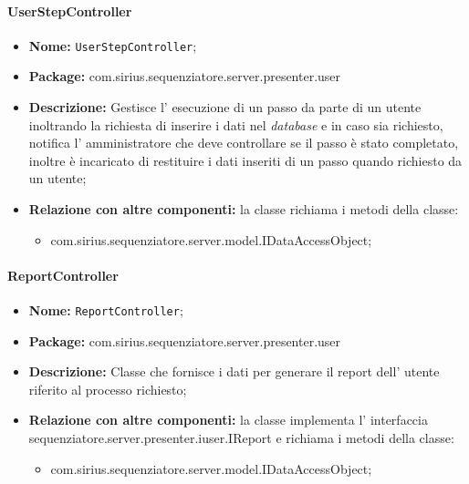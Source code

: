 \paragraph{UserStepController}
	\begin{itemize}
		\item \textbf{Nome:} \texttt{UserStepController};
		\item \textbf{Package:} com.sirius.sequenziatore.server.presenter.user
		\item \textbf{Descrizione:} Gestisce l' esecuzione di un passo da parte di un utente inoltrando la richiesta di inserire i dati nel \textit{database} e in caso sia richiesto, notifica l' amministratore che deve controllare se il passo è stato completato, inoltre è incaricato di restituire i dati inseriti di un passo quando richiesto da un utente;
		\item \textbf{Relazione con altre componenti:} la classe richiama i metodi della classe:
		\begin{itemize}
			\item com.sirius.sequenziatore.server.model.IDataAccessObject;
		\end{itemize}
	\end{itemize}
\paragraph{ReportController}
	\begin{itemize}
		\item \textbf{Nome:} \texttt{ReportController};
		\item \textbf{Package:} com.sirius.sequenziatore.server.presenter.user
		\item \textbf{Descrizione:} Classe che fornisce i dati per generare il report dell' utente riferito al processo richiesto;
		\item \textbf{Relazione con altre componenti:} la classe implementa l' interfaccia sequenziatore.server.presenter.iuser.IReport e richiama i metodi della classe:
		\begin{itemize}
			\item com.sirius.sequenziatore.server.model.IDataAccessObject;
		\end{itemize}
	\end{itemize}
